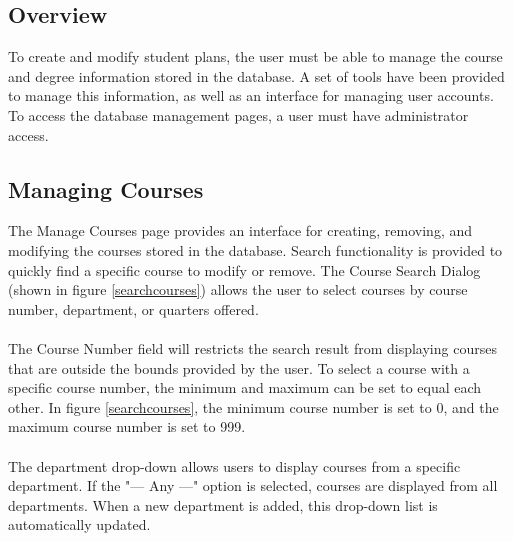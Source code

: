 \documentclass[]{article}
\begin{document}
	\subsection{Overview}\label{ssec:18}
		To create and modify student plans, the user must be able to manage the course and degree information stored in the database. A set of tools have been provided to manage this information, as well as an interface for managing user accounts. To access the database management pages, a user must have administrator access. 
	\subsection{Managing Courses}\label{ssec:12}
		The Manage Courses page provides an interface for creating, removing, and modifying the courses stored in the database. Search functionality is provided to quickly find a specific course to modify or remove. The Course Search Dialog (shown in figure \ref{searchcourses}) allows the user to select courses by course number, department, or quarters offered. \\~\\
		
		The Course Number field will restricts the search result from displaying courses that are outside the bounds provided by the user. To select a course with a specific course number, the minimum and maximum can be set to equal each other. In figure \ref{searchcourses}, the minimum course number is set to 0, and the maximum course number is set to 999. \\~\\
		
		The department drop-down allows users to display courses from a specific department. If the "--- Any ---" option is selected, courses are displayed from all departments. When a new department is added, this drop-down list is automatically updated. \\~\\
		
\end{document}

